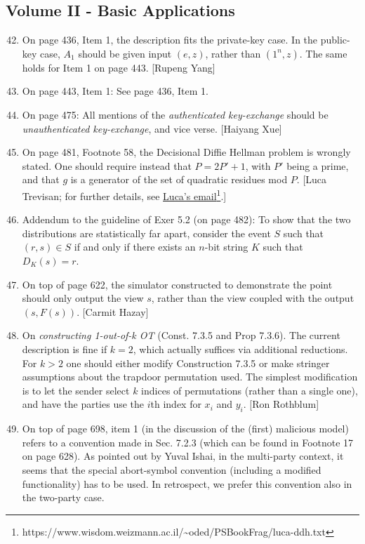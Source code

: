 \documentclass[10pt,a4paper]{article}
\begin{document}
\subsection{Volume II - Basic Applications}
\begin{enumerate}
	\setcounter{enumi}{41}
	\item On page 436, Item 1, the description fits the private-key case. In the public-key case, $A_1$ should be given input $(e,z)$, rather than $(1^n,z)$. The same holds for Item 1 on page 443. [Rupeng Yang]
	\item On page 443, Item 1: See page 436, Item 1.
	\item On page 475: All mentions of the \textit{authenticated key-exchange} should be \textit{unauthenticated key-exchange}, and vice verse. [Haiyang Xue]
	\item On page 481, Footnote 58, the Decisional Diffie Hellman problem is wrongly stated. One should require instead that $P=2P'+1$, with $P'$ being a prime, and that $g$ is a generator of the set of quadratic residues mod $P$. [Luca Trevisan; for further details, see \href{https://www.wisdom.weizmann.ac.il/~oded/PSBookFrag/luca-ddh.txt}{Luca's email}\footnote{https://www.wisdom.weizmann.ac.il/\textasciitilde oded/PSBookFrag/luca-ddh.txt}.]
	\item Addendum to the guideline of Exer 5.2 (on page 482): To show that the two distributions are statistically far apart, consider the event $S$ such that $(r,s)\in S$ if and only if there exists an $n$-bit string $K$ such that $D_K(s)=r$.
	\item On top of page 622, the simulator constructed to demonstrate the point should only output the view $s$, rather than the view coupled with the output $(s,F(s))$. [Carmit Hazay]
	\item On \textit{constructing 1-out-of-k OT} (Const. 7.3.5 and Prop 7.3.6). The current description is fine if $k=2$, which actually suffices via additional reductions. For $k>2$ one should either modify Construction 7.3.5 or make stringer assumptions about the trapdoor permutation used. The simplest modification is to let the sender select $k$ indices of permutations (rather than a single one), and have the parties use the $i$th index for $x_i$ and $y_i$. [Ron Rothblum]
	\item On top of page 698, item 1 (in the discussion of the (first) malicious model) refers to a convention made in Sec. 7.2.3 (which can be found in Footnote 17 on page 628). As pointed out by Yuval Ishai, in the multi-party context, it seems that the special abort-symbol convention (including a modified functionality) has to be used. In retrospect, we prefer this convention also in the two-party case.

\end{enumerate}
\end{document}
